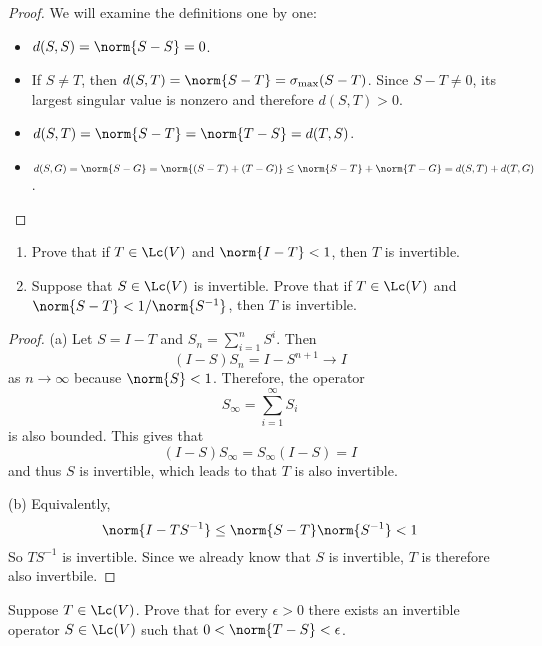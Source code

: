 \documentclass{extarticle}
\begin{document}
\begin{proof}
We will examine the definitions one by one:
\begin{itemize}
    \item \(d(S, S) = \norm{S - S} = 0\).
    \item If \(S \neq T\), then \(d(S, T)
    = \norm{S - T} = \sigma_{\max}(S - T) \). Since
    \(S - T \neq 0\), its largest singular value is nonzero
    and therefore \(d(S, T) > 0\).
    \item \(d(S, T) = \norm{S - T} = \norm{T - S} =
    d(T, S)\).
    \item \(d(S, G) = \norm{S - G}
    = \norm{(S - T) + (T - G)}
    \leq \norm{S - T} + \norm{T - G}
    = d(S, T) + d(T, G)\).
\end{itemize}
\end{proof}

\begin{problem}{8}
    \begin{enumerate}[label=(\alph*)]
        \item Prove that if \(T \in \Lc(V)\) and
        \(\norm{I - T} < 1\), then \(T\) is invertible.
        \item Suppose that \(S \in \Lc(V)\) is invertible.
        Prove that if \(T \in \Lc(V)\) and
        \(\norm{S - T} < 1/\norm{S^{-1}}\), then
        \(T\) is invertible.
    \end{enumerate}
\end{problem}

\begin{proof}
(a) Let \(S = I - T\) and \(S_n = \sum_{i=1}^{n} S^{i}\).
Then
\[(I - S)S_n = I - S^{n+1} \to I\]
as \(n \to \infty\) because \(\norm{S} < 1\). Therefore, the operator
\[S_\infty = \sum_{i=1}^{\infty} S_i\]
is also bounded. This gives that
\[(I - S)S_{\infty} = S_{\infty} (I - S) = I\]
and thus \(S\) is invertible, which leads to that \(T\) is also invertible.

(b) Equivalently,
\[ \norm{I - TS^{-1}}  \leq \norm{S - T} \norm{S^{-1}} < 1\]
So \(TS^{-1}\) is invertible. Since we already know that
\(S\) is invertible, \(T\) is therefore also invertbile.
\end{proof}

\begin{problem}{9}
    Suppose \(T \in \Lc(V)\). Prove that for every \(\epsilon > 0\)
    there exists an invertible operator \(S \in \Lc(V)\)
    such that \(0 < \norm{T - S } < \epsilon\).
\end{problem}
\end{document}
